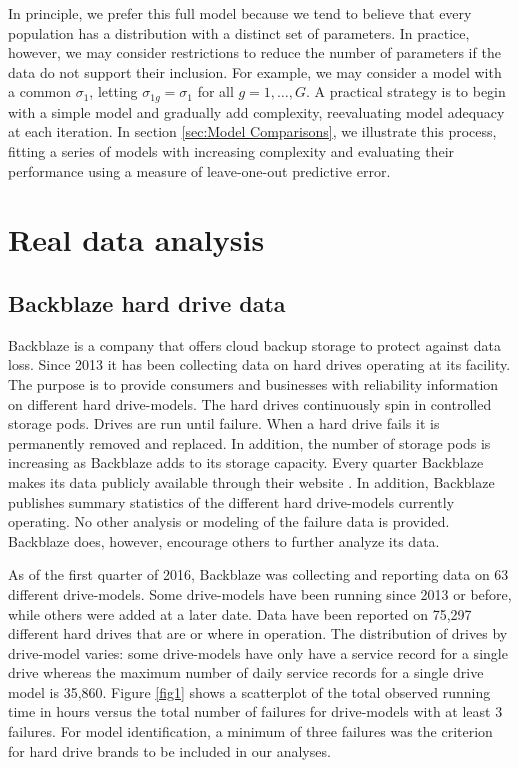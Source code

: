 \documentclass[12pt]{article}
\begin{document}
In principle, we prefer this full model because we tend to believe that every population has a distribution with a distinct set of parameters. In practice, however, we may consider restrictions to reduce the number of parameters if the data do not support their inclusion. For example, we may consider a model with a common $\sigma_{1}$, letting $\sigma_{1g}=\sigma_1$ for all $g=1,\ldots,G$. A practical strategy is to begin with a simple model and gradually add complexity, reevaluating model adequacy at each iteration. In section \ref{sec:Model Comparisons}, we illustrate this process, fitting a series of models with increasing complexity and evaluating their performance using a measure of leave-one-out predictive error.


\section{Real data analysis}
\label{sec:Data analysis}
\subsection{Backblaze hard drive data}
\label{sec:Data}
Backblaze is a company that offers cloud backup storage to protect against data loss.  Since 2013 it has been collecting data on hard drives operating at its facility.  The purpose is to provide consumers and businesses with reliability information on different hard drive-models.  The hard drives continuously spin in controlled storage pods.  Drives are run until failure.  When a hard drive fails it is permanently removed and replaced.  In addition, the number of storage pods is increasing as Backblaze adds to its storage capacity.  Every quarter Backblaze makes its data publicly available through their website \cite{backblaze}. In addition, Backblaze publishes summary statistics of the different hard drive-models currently operating.  No other analysis or modeling of the failure data is provided.  Backblaze does, however, encourage others to further analyze its data. 

As of the first quarter of 2016, Backblaze was collecting and reporting data on 63 different drive-models.  Some drive-models have been running since 2013 or before, while others were added at a later date.  Data have been reported on 75,297 different hard drives that are or where in operation.  The distribution of drives by drive-model varies: some drive-models have only have a service record for a single drive whereas the maximum number of daily service records for a single drive model is 35,860.  Figure \ref{fig1} shows a scatterplot of the total observed running time in hours versus the total number of failures for drive-models with at least 3 failures.  For model identification, a minimum of three failures was the criterion for hard drive brands to be included in our analyses.  
\end{document}
